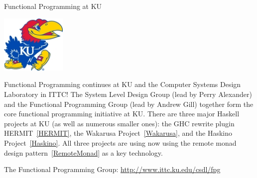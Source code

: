 \begin{hcarentry}{Functional Programming at KU}
\label{ukansas}
\makeheader

\begin{center}
\includegraphics[width=0.235\textwidth]{html/jh2.jpg}
\end{center}

Functional Programming continues at KU and the Computer Systems Design
Laboratory in ITTC!  The System Level Design Group (lead by Perry Alexander)
and the Functional Programming Group (lead by Andrew Gill) together form the
core functional programming initiative at KU.  There are three major Haskell
projects at KU (as well as numerous smaller ones): the GHC rewrite plugin
HERMIT~\cref{HERMIT}, the Wakarusa Project~\cref{Wakarusa}, and the Haskino
Project~\cref{Haskino}.  All three projects are using now using the remote
monad design pattern~\cref{RemoteMonad} as a key technology.

\FurtherReading
The Functional Programming Group:
    \url{http://www.ittc.ku.edu/csdl/fpg}
\end{hcarentry}
